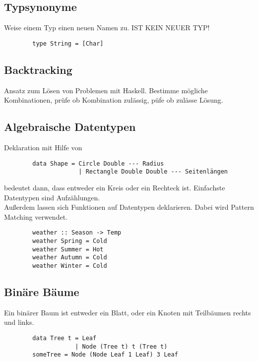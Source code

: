         \subsection{Typsynonyme}
        Weise einem Typ einen neuen Namen zu. IST KEIN NEUER TYP!
        \begin{lstlisting}
        type String = [Char]
       \end{lstlisting}

        \subsection{Backtracking}
        Ansatz zum Lösen von Problemen mit Haskell.
        Bestimme mögliche Kombinationen, prüfe ob Kombination zulässig, püfe ob zulässe Lösung.

        \subsection{Algebraische Datentypen}
        Deklaration mit Hilfe von 
        \begin{lstlisting}
        data Shape = Circle Double --- Radius
                     | Rectangle Double Double --- Seitenlängen
      \end{lstlisting}
         bedeutet dann, dass  entweder ein Kreis oder ein Rechteck ist.
        Einfachste Datentypen sind Aufzählungen.\\
        Außerdem lassen sich Funktionen auf Datentypen deklarieren. Dabei wird Pattern Matching verwendet.
        \begin{lstlisting}
        weather :: Season -> Temp
        weather Spring = Cold
        weather Summer = Hot
        weather Autumn = Cold
        weather Winter = Cold
      \end{lstlisting}

        \subsection{Binäre Bäume}
        Ein binärer Baum ist entweder ein Blatt, oder ein Knoten mit Teilbäumen rechts und links.
        \begin{lstlisting}
        data Tree t = Leaf
                    | Node (Tree t) t (Tree t)
        someTree = Node (Node Leaf 1 Leaf) 3 Leaf 
       \end{lstlisting}

